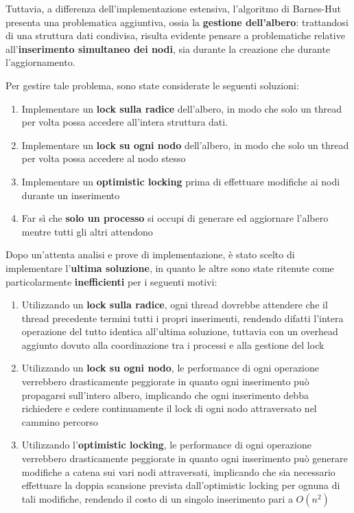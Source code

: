 \documentclass[12pt]{report}
\begin{document}
    Tuttavia, a differenza dell'implementazione estensiva, l'algoritmo di Barnes-Hut presenta una problematica aggiuntiva, ossia la \textbf{gestione dell'albero}: trattandosi di una struttura dati condivisa, risulta evidente pensare a problematiche relative all'\textbf{inserimento simultaneo dei nodi}, sia durante la creazione che durante l'aggiornamento.

    Per gestire tale problema, sono state considerate le seguenti soluzioni:

    \begin{enumerate}
        \item Implementare un \textbf{lock sulla radice} dell'albero, in modo che solo un thread per volta possa accedere all'intera struttura dati.
                
        \item Implementare un \textbf{lock su ogni nodo} dell'albero, in modo che solo un thread per volta possa accedere al nodo stesso
        
        \item Implementare un \textbf{optimistic locking} prima di effettuare modifiche ai nodi durante un inserimento

        \item Far sì che \textbf{solo un processo} si occupi di generare ed aggiornare l'albero mentre tutti gli altri attendono
    \end{enumerate}

    Dopo un'attenta analisi e prove di implementazione, è stato scelto di implementare l'\textbf{ultima soluzione}, in quanto le altre sono state ritenute come particolarmente \textbf{inefficienti} per i seguenti motivi:

    \begin{enumerate}
        \item Utilizzando un \textbf{lock sulla radice}, ogni thread dovrebbe attendere che il thread precedente termini tutti i propri inserimenti, rendendo difatti l'intera operazione del tutto identica all'ultima soluzione, tuttavia con un overhead aggiunto dovuto alla coordinazione tra i processi e alla gestione del lock
        \item Utilizzando un \textbf{lock su ogni nodo}, le performance di ogni operazione verrebbero drasticamente peggiorate in quanto ogni inserimento può propagarsi sull'intero albero, implicando che ogni inserimento debba richiedere e cedere continuamente il lock di ogni nodo attraversato nel cammino percorso
        \item Utilizzando l'\textbf{optimistic locking}, le performance di ogni operazione verrebbero drasticamente peggiorate in quanto ogni inserimento può generare modifiche a catena sui vari nodi attraversati, implicando che sia necessario effettuare la doppia scansione prevista dall'optimistic locking per ognuna di tali modifiche, rendendo il costo di un singolo inserimento pari a $O(n^2)$  
    \end{enumerate}
\end{document}
